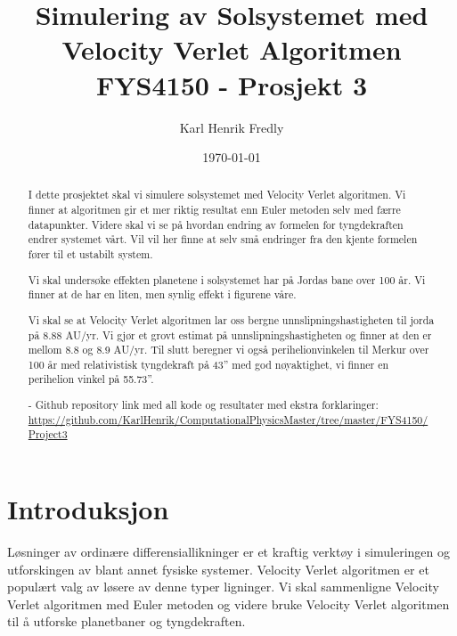\documentclass[reprint,english,notitlepage]{revtex4-1}
\begin{document}
	
\title{Simulering av Solsystemet med Velocity Verlet Algoritmen \\
	\normalsize FYS4150 - Prosjekt 3}
\date{\today}               
\author{Karl Henrik Fredly}

\newpage
	
\begin{abstract} %
	I dette prosjektet skal vi simulere solsystemet med Velocity Verlet algoritmen. Vi finner at algoritmen gir et mer riktig resultat enn Euler metoden selv med færre datapunkter. Videre skal vi se på hvordan endring av formelen for tyngdekraften endrer systemet vårt. Vil vil her finne at selv små endringer fra den kjente formelen fører til et ustabilt system.
	
	Vi skal undersøke effekten planetene i solsystemet har på Jordas bane over 100 år. Vi finner at de har en liten, men synlig effekt i figurene våre.
	
	Vi skal se at Velocity Verlet algoritmen lar oss bergne unnslipningshastigheten til jorda på 8.88 AU/yr. Vi gjør et grovt estimat på unnslipningshastigheten og finner at den er mellom 8.8 og 8.9 AU/yr. Til slutt beregner vi også perihelionvinkelen til Merkur over 100 år med relativistisk tyngdekraft på 43'' med god nøyaktighet, vi finner en perihelion vinkel på 55.73''.
	
	- Github repository link med all kode og resultater med ekstra forklaringer: \href{https://github.com/KarlHenrik/ComputationalPhysicsMaster/tree/master/FYS4150/Project3}{https://github.com/KarlHenrik/ComputationalPhysicsMaster/tree/master/FYS4150/Project3}
\end{abstract}
\maketitle

\section{Introduksjon} %
	Løsninger av ordinære differensiallikninger er et kraftig verktøy i simuleringen og utforskingen av blant annet fysiske systemer. Velocity Verlet algoritmen er et populært valg av løsere av denne typer ligninger. Vi skal sammenligne Velocity Verlet algoritmen med Euler metoden og videre bruke Velocity Verlet algoritmen til å utforske planetbaner og tyngdekraften.
	
\end{document}
